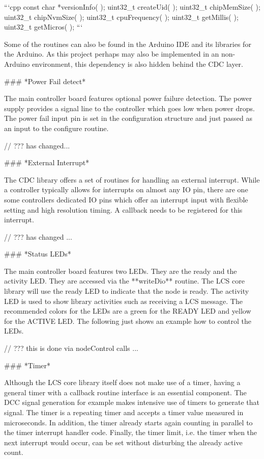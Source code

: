 ```cpp
   const char    *versionInfo( );
   uint32_t      createUid( );
   uint32_t      chipMemSize( );
   uint32_t      chipNvmSize( );
   uint32_t      cpuFrequency( );
   uint32_t      getMillis( );
   uint32_t      getMicros( );
```

Some of the routines can also be found in the Arduino IDE and its libraries for the Arduino. As this project perhaps may also be implemented in an non-Arduino environment, this dependency is also hidden behind the CDC layer.

### *Power Fail detect*

The main controller board features optional power failure detection. The power supply provides a signal line to the controller which goes low when power drops. The power fail input pin is set in the configuration structure and just passed as an input to the configure routine. 


// ??? has changed...



### *External Interrupt*

The CDC library offers a set of routines for handling an external interrupt. While a controller typically allows for interrupts on almost any IO pin, there are one some controllers dedicated IO pins which offer an interrupt input with flexible setting and high resolution timing. A callback needs to be registered for this interrupt.

// ??? has changed ...


### *Status LEDs*

The main controller board features two LEDs. They are the ready and the activity LED. They are accessed via the **writeDio** routine. The LCS core library will use the ready LED to indicate that the node is ready. The activity LED is used to show library activities such as receiving a LCS message. The recommended colors for the LEDs are a green for the READY LED and yellow for the ACTIVE LED. The following just shows an example how to control the LEDs.

// ??? this is done via nodeControl calls ...


### *Timer*

Although the LCS core library itself does not make use of a timer, having a general timer with a callback routine interface is an essential component. The DCC signal generation for example makes intensive use of timers to generate that signal. The timer is a repeating timer and accepts a timer value measured in microseconds. In addition, the timer already starts again counting in parallel to the timer interrupt handler code. Finally, the timer limit, i.e. the timer when the next interrupt would occur, can be set without disturbing the already active count.

